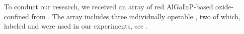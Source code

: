 	To conduct our research, we received an array of red AlGaInP-based oxide-confined \VCSELs from \michler. The array includes three individually operable \VCSELs, two of which, labeled \BmFour and \BmTwo were used in our experiments, see .

	\begin{figure}[!htb]
		\begin{subfigure}[t]{ 0.49\linewidth}
			\centering
			\caption{}
			\label{subfig::vcsel_sem_big_overview}
		\end{subfigure}
		\hfill
		\begin{subfigure}[t]{ 0.49\linewidth}
			\centering

\end{subfigure}
\end{figure}
